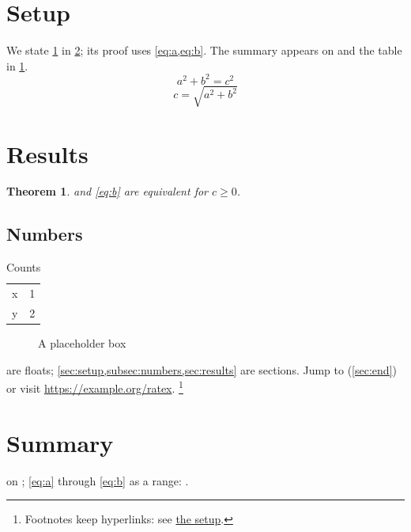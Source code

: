 \documentclass[11pt]{article}
\newtheorem{theorem}{Theorem}[section]
\begin{document}
\tableofcontents
\section{Setup}\label{sec:setup}
We state \cref{thm:main} in \cref{sec:results}; its proof uses \cref{eq:a,eq:b}.
The summary appears on  and the table in \cref{tab:data}.
\begin{equation}\label{eq:a} a^{2}+b^{2}=c^{2}\end{equation}
\begin{equation}\label{eq:b} c = \sqrt{a^{2}+b^{2}}\end{equation}
\clearpage
\section{Results}\label{sec:results}
\begin{theorem}\label{thm:main}
 and \cref{eq:b} are equivalent for $c\ge0$.
\end{theorem}
\subsection{Numbers}\label{subsec:numbers}
\begin{table}[ht]
\centering\caption{Counts}\label{tab:data}
\begin{tabular}{lr}\hline x & 1\\ y & 2\\\hline\end{tabular}
\end{table}
\begin{figure}[ht]
\centering\fbox{\rule{0pt}{1.2cm}\rule{3cm}{0pt}}
\caption{A placeholder box}\label{fig:box}
\end{figure}
 are floats; \cref{sec:setup,subsec:numbers,sec:results} are sections.
Jump to  (\autoref{sec:end}) or visit \url{https://example.org/ratex}.
\footnote{Footnotes keep hyperlinks: see \hyperref[sec:setup]{the setup}.}
\clearpage
\section{Summary}\label{sec:end}
 on ; \cref{eq:a} through \cref{eq:b} as a range:
.
\end{document}
